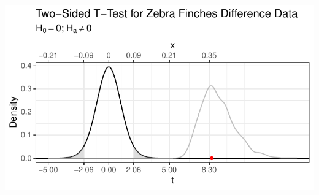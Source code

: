 \documentclass{article}\usepackage[]{graphicx}\usepackage[]{xcolor}
\makeatletter
\def\maxwidth{ %
  \ifdim\Gin@nat@width>\linewidth
    \linewidth
  \else
    \Gin@nat@width
  \fi
}
\newenvironment{knitrout}{}{} %
\makeatother
\begin{document}
\begin{enumerate}
\begin{enumerate}
\begin{knitrout}
{\centering \includegraphics[width=\maxwidth]{figure/unnamed-chunk-11-1} 

}


\end{knitrout}
\end{enumerate}
\end{enumerate}



\end{document}
